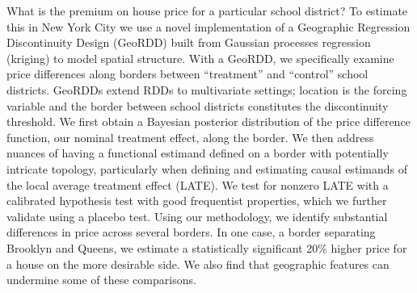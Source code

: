 What is the premium on house price for a particular school district?
To estimate this in New York City we use a novel implementation of a Geographic Regression Discontinuity Design (GeoRDD) built from Gaussian processes regression (kriging) to model spatial structure.
With a GeoRDD, we specifically examine price differences along borders between ``treatment'' and ``control'' school districts.
GeoRDDs extend RDDs to multivariate settings; location is the forcing variable and the border between school districts constitutes the discontinuity threshold.
We first obtain a Bayesian posterior distribution of the price difference function, our nominal treatment effect, along the border.
We then address nuances of having a functional estimand defined on a border with potentially intricate topology, particularly when defining and estimating causal estimands of the local average treatment effect (LATE).
We test for nonzero LATE with a calibrated hypothesis test with good frequentist properties, which we further validate using a placebo test.
Using our methodology, we identify substantial differences in price across several borders.
In one case, a border separating Brooklyn and Queens, we estimate a statistically significant 20\% higher price for a house on the more desirable side.
We also find that geographic features can undermine some of these comparisons.
